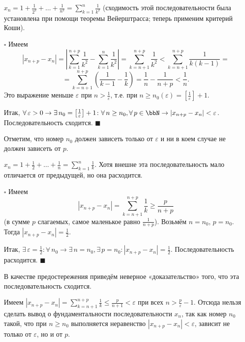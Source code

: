
\begin{exmpl} \label{exmpl:29}
$x_n = 1 + \frac{1}{2^2} + \dots + \frac{1}{n^2} = \sum\limits_{k=1}^n \frac{1}{k^2}$ (сходимость этой последовательности была установлена при помощи теоремы Вейерштрасса; теперь применим критерий Коши).


\smallskip
$\square$ Имеем
$$
|x_{n+p} - x_n| = \left| \sum_{k=1}^{n+p} \frac{1}{k^2} - \sum_{k=1}^n \frac{1}{k^2} \right| = \sum_{k=n+1}^{n+p} \frac{1}{k^2} < \sum_{k=n+1}^{n+p} \frac{1}{k(k-1)} =
$$
$$
= \sum_{k=n+1}^{n+p} \left( \frac{1}{k-1} - \frac{1}{k} \right) = \frac{1}{n} - \frac{1}{n+p} < \frac{1}{n}.
$$
Это выражение меньше $\varepsilon$ при $n > \frac{1}{\varepsilon}$, т.е. при $n \ge n_0(\varepsilon) = \left[ \frac{1}{\varepsilon} \right] + 1$.

Итак, $\forall\, \varepsilon > 0 \to \exists\, n_0 = \left[ \frac{1}{\varepsilon} \right] + 1 \colon \forall\, n \ge n_0, \forall\, p \in \bbN \to |x_{n+p} - x_n| < \varepsilon$. Последовательность сходится. \hfill$\blacksquare$
\end{exmpl}

\begin{notion}
Отметим, что номер $n_0$ должен зависеть только от $\varepsilon$ и ни в коем случае не должен зависеть от $p$.
\end{notion}


\begin{exmpl} \label{exmpl:30}
$x_n = 1 + \frac{1}{2} + \dots + \frac{1}{n} = \sum\limits_{k=1}^n \frac{1}{k}$. Хотя внешне эта последовательность мало отличается от предыдущей, но она расходится.

\smallskip
$\square$ Имеем
$$
|x_{n+p} - x_n| = \sum_{k=n+1}^{n+p} \frac{1}{k} \ge \frac{p}{n+p}
$$
(в сумме $p$ слагаемых, самое маленькое равно $\frac{1}{n+p}$). Возьмём $n = n_0$, $p = n_0$. Тогда $|x_{n+p} - x_n| = \frac{1}{2}$.

Итак, $\exists\, \varepsilon = \frac{1}{2} \colon \forall\, n_0 \to \exists\, n = n_0, \exists\, p = n_0 \colon |x_{n+p} - x_n| = \frac{1}{2}$. Последовательность расходится. \hfill$\blacksquare$

В качестве предостережения приведём неверное «доказательство» того, что эта последовательность сходится.

Имеем $|x_{n+p} - x_n| = \sum\limits_{k=n+1}^{n+p} \frac{1}{k} \le \frac{p}{n+1} < \varepsilon$ при всех $n > \frac{p}{\varepsilon} - 1$. Отсюда нельзя сделать вывод о фундаментальности последовательности $x_n$, так как номер $n_0$ такой, что при $n \ge n_0$ выполняется неравенство $|x_{n+p} - x_n| < \varepsilon$, зависит не только от $\varepsilon$, но и от $p$.

\end{exmpl}